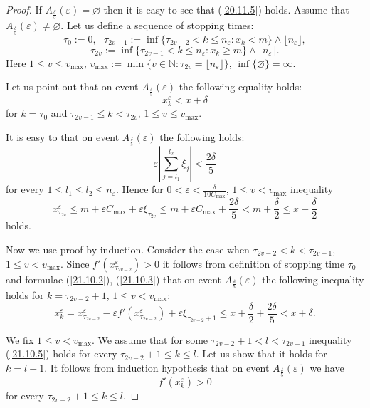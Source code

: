\documentclass{article}
\theoremstyle{plain}
\theoremstyle{definition}
\theoremstyle{remark}
\newcommand{\beq}{\begin{equation}}
\newcommand{\eeq}{\end{equation}}
\begin{document}
\begin{proof}
If $A_{\frac{\delta}{5}}\left(\varepsilon\right)=\varnothing$ then it is easy to see that (\ref{20.11.5})
holds. Assume that $A_{\frac{\delta}{5}}\left(\varepsilon\right)\neq\varnothing$.
Let us define a sequence of stopping times:
$$
\tau_0:=0, \ \ \
\tau_{2v-1}:=\inf\{\tau_{2v-2}< k \leqslant n_\varepsilon:x_k<m\}\wedge \lfloor n_\varepsilon \rfloor,
$$
$$
\tau_{2v}:=\inf\{\tau_{2v-1}< k \leqslant n_\varepsilon:x_k\geqslant m\}\wedge \lfloor n_\varepsilon \rfloor.
$$
Here $1\leqslant v \leqslant v_{\max}$, $v_{\max}:=\min\{v\in \mathbb{N}:\tau_{2v}= \lfloor n_\varepsilon \rfloor\}$, $\inf\{\varnothing\}=\infty$.

Let us point out that on event $A_{\frac{\delta}{5}}\left(\varepsilon\right)$ the following equality holds:
\beq \label{21.10.1}
x_k^{\varepsilon}<x+\delta 
\eeq
for $k=\tau_0$ and $\tau_{2v-1}\leqslant k < \tau_{2v}$, $1\leqslant v \leqslant v_{\max}$.


It is easy to that on event $A_{\frac{\delta}{5}}\left(\varepsilon\right)$ the following holds:
\beq \label{21.10.2}
\varepsilon\left|\sum\limits_{j=l_1}^{l_2}\xi_j\right|<\frac{2\delta}{5}
\eeq
for every $1\leqslant l_1\leqslant l_2 \leqslant n_\varepsilon$. Hence for $0<\varepsilon<\frac{\delta}{10C_{\max}}$,
$1\leqslant v < v_{\max}$ inequality
\beq \label{21.10.3}
x_{\tau_{2v}}^{\varepsilon}\leqslant m+ \varepsilon C_{\max}+\varepsilon\xi_{\tau_{2v}}
\leqslant m+ \varepsilon C_{\max}+\frac{2\delta}{5}<m+\frac{\delta}{2}
\leqslant x+\frac{\delta}{2}
\eeq
holds.

Now we use proof by induction. Consider the case when
 $\tau_{2v-2}<k< \tau_{2v-1}$, $1\leqslant v < v_{\max}$. Since $f'(x_{\tau_{2v-2}}^{\varepsilon})>0$ it follows from definition of stopping time $\tau_0$
and formulae (\ref{21.10.2}), (\ref{21.10.3})  that on event $A_{\frac{\delta}{5}}\left(\varepsilon\right)$ the following inequality holds for $k=\tau_{2v-2}+1$, $1\leqslant v < v_{\max}$:
\beq \label{21.10.5}
x_k^{\varepsilon}=x_{\tau_{2v-2}}^{\varepsilon}-\varepsilon f'(x_{\tau_{2v-2}}^{\varepsilon})+\varepsilon\xi_{\tau_{2v-2}+1}
\leqslant x+\frac{\delta}{2}+\frac{2\delta}{5}<x+\delta.
\eeq

We fix $1\leqslant v < v_{\max}$.
We assume that for some $\tau_{2v-2}+1<l<\tau_{2v-1}$ inequality (\ref{21.10.5}) holds for every $\tau_{2v-2}+1\leqslant k\leqslant l$. Let us show that it holds for $k=l+1$. It follows from induction hypothesis that on event $A_{\frac{\delta}{5}}\left(\varepsilon\right)$ we have
\beq \label{21.10.7}
f'(x_k^{\varepsilon})>0
\eeq
for every $\tau_{2v-2}+1\leqslant k\leqslant l$.


\end{proof}
\end{document}
